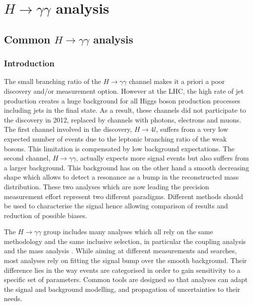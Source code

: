 \part{\(H\rightarrow\gamma\gamma\) analysis}
\label{sec:org3ff4562}

\label{HGam}

\chapter{Common \(H\rightarrow\gamma\gamma\) analysis}
\label{sec:orgb822321}

\section{Introduction}
\label{sec:org235a67d}
The small branching ratio of the $H\rightarrow\gamma\gamma$ channel makes it a priori a poor discovery and/or measurement option.
However at the LHC, the high rate of jet production creates a huge background for all Higgs boson production processes including jets in the final state.
As a result, these channels did not participate to the discovery in 2012, replaced by channels with photons, electrons and muons.
The first channel involved in the discovery, $H\rightarrow 4l$, suffers from a very low expected number of events due to the leptonic branching ratio of the weak bosons.
This limitation is compensated by low background expectations.
The second channel, $H\rightarrow\gamma\gamma$, actually expects more signal events but also suffers from a larger background.
This background has on the other hand a smooth decreasing shape which allows to detect a resonance as a bump in the reconstructed mass distribution.
These two analyses which are now leading the precision measurement effort represent two different paradigms.
Different methods should be used to characterise the signal hence allowing comparison of results and reduction of possible biases.


The $H\rightarrow\gamma\gamma$ group includes many analyses which all rely on the same methodology and the same inclusive selection, in particular the coupling analysis \cite{ATLAS-CONF-2017-045} and the mass analysis \cite{ATLAS-CONF-2017-046}.
While aiming at different measurements and searches, most analyses rely on fitting the signal bump over the smooth background.
Their difference lies in the way events are categorised in order to gain sensitivity to a specific set of parameters.
Common tools are designed so that analyses can adapt the signal and background modelling, and propagation of uncertainties to their needs.

